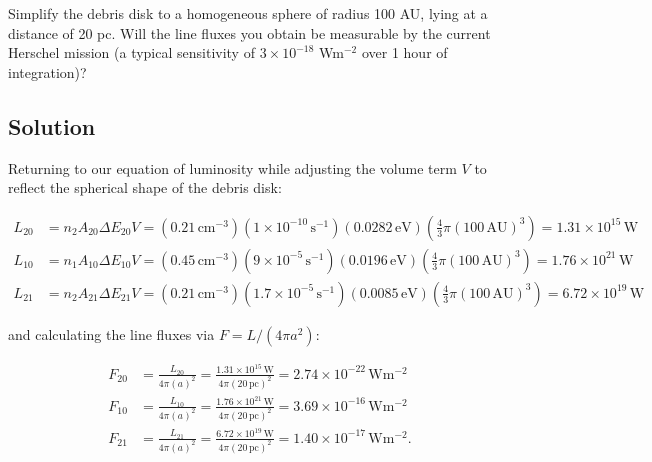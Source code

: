 \documentclass[12pt]{article}
\begin{document}
Simplify the debris disk to a homogeneous sphere of radius 100 AU, lying at a distance of 20 pc. Will the line fluxes you obtain be measurable by the current Herschel mission (a typical sensitivity of $3 \times 10^{-18}$ Wm$^{-2}$ over 1 hour of integration)?


\subsection*{Solution}

Returning to our equation of luminosity while adjusting the volume term $V$ to reflect the spherical shape of the debris disk:

\begin{equation*}
\begin{split}
L_{20} &= n_2A_{20}\Delta E_{20}V = (0.21\,\mathrm{cm^{-3}})(1\times10^{-10}\,\mathrm{s^{-1}})(0.0282\,\mathrm{eV})(\frac{4}{3}\pi(100\,\mathrm{AU})^3) = 1.31\times10^{15} \,\mathrm{W}\\
L_{10} &= n_1A_{10}\Delta E_{10}V = (0.45\,\mathrm{cm^{-3}})(9\times10^{-5}\,\mathrm{s^{-1}})(0.0196\,\mathrm{eV})(\frac{4}{3}\pi(100\,\mathrm{AU})^3) = 1.76\times10^{21} \,\mathrm{W}\\
L_{21} &= n_2A_{21}\Delta E_{21}V = (0.21\,\mathrm{cm^{-3}})(1.7\times10^{-5}\,\mathrm{s^{-1}})(0.0085\,\mathrm{eV})(\frac{4}{3}\pi(100\,\mathrm{AU})^3)= 6.72\times10^{19} \,\mathrm{W}
\end{split}
\end{equation*}

and calculating the line fluxes via $F = L/(4\pi a^2)$:

\begin{equation*}
\begin{split}
F_{20} &= \frac{L_{20}}{4\pi(a)^2} = \frac{1.31\times10^{15} \,\mathrm{W}}{4\pi(20\,\mathrm{pc})^2} = 2.74\times10^{-22}\,\mathrm{Wm^{-2}}\\
F_{10} &= \frac{L_{10}}{4\pi(a)^2} = \frac{1.76\times10^{21} \,\mathrm{W}}{4\pi(20\,\mathrm{pc})^2} = 3.69\times10^{-16}\,\mathrm{Wm^{-2}}\\
F_{21} &= \frac{L_{21}}{4\pi(a)^2} = \frac{6.72\times10^{19} \,\mathrm{W}}{4\pi(20\,\mathrm{pc})^2} = 1.40\times10^{-17}\,\mathrm{Wm^{-2}}.
\end{split}
\end{equation*}
\end{document}

